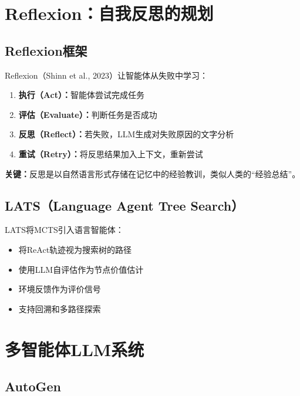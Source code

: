 \section{Reflexion：自我反思的规划 \grad}

\subsection{Reflexion框架}

Reflexion（Shinn et al., 2023）让智能体从失败中学习：

\begin{algbox}[title={\textbf{Reflexion工作流程}}]
\begin{enumerate}
  \item \textbf{执行（Act）：}智能体尝试完成任务
  \item \textbf{评估（Evaluate）：}判断任务是否成功
  \item \textbf{反思（Reflect）：}若失败，LLM生成对失败原因的文字分析
  \item \textbf{重试（Retry）：}将反思结果加入上下文，重新尝试
\end{enumerate}
\textbf{关键：}反思是以自然语言形式存储在记忆中的经验教训，类似人类的``经验总结''。
\end{algbox}

\subsection{LATS（Language Agent Tree Search）\self}

LATS将MCTS引入语言智能体：
\begin{itemize}
  \item 将ReAct轨迹视为搜索树的路径
  \item 使用LLM自评估作为节点价值估计
  \item 环境反馈作为评价信号
  \item 支持回溯和多路径探索
\end{itemize}

\section{多智能体LLM系统 \self}

\subsection{AutoGen}

